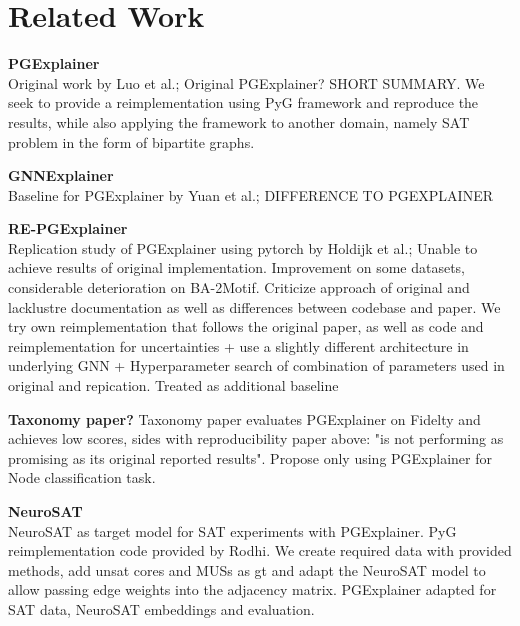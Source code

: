 \chapter{Related Work}

\textbf{PGExplainer} \\
Original work by Luo et al.\cite{luo2020parameterized}; Original PGExplainer? SHORT SUMMARY. We seek to provide a reimplementation using PyG framework and reproduce the results, while also applying the framework to another domain, namely SAT problem in the form of bipartite graphs.\bigskip

\textbf{GNNExplainer} \\
Baseline for PGExplainer by Yuan et al.\cite{ying2019gnnexplainer}; DIFFERENCE TO PGEXPLAINER

\textbf{RE-PGExplainer} \\
Replication study of PGExplainer using pytorch by Holdijk et al.\cite{holdijk2021re};
Unable to achieve results of original implementation. Improvement on some datasets, considerable deterioration on BA-2Motif. Criticize approach of original and lacklustre documentation as well as differences between codebase and paper.
We try own reimplementation that follows the original paper, as well as code and reimplementation for uncertainties + use a slightly different architecture in underlying GNN + Hyperparameter search of combination of parameters used in original and repication. Treated as additional baseline\bigskip

\textbf{Taxonomy paper?}
Taxonomy paper evaluates PGExplainer on Fidelty and achieves low scores, sides with reproducibility paper above: "is not performing as promising as its original
reported results". Propose only using PGExplainer for Node classification task.\bigskip

\textbf{NeuroSAT} \\
NeuroSAT as target model for SAT experiments with PGExplainer. PyG reimplementation code provided by Rodhi. We create required data with provided methods, add unsat cores and MUSs as gt and adapt the NeuroSAT model to allow passing edge weights into the adjacency matrix. PGExplainer adapted for SAT data, NeuroSAT embeddings and evaluation.